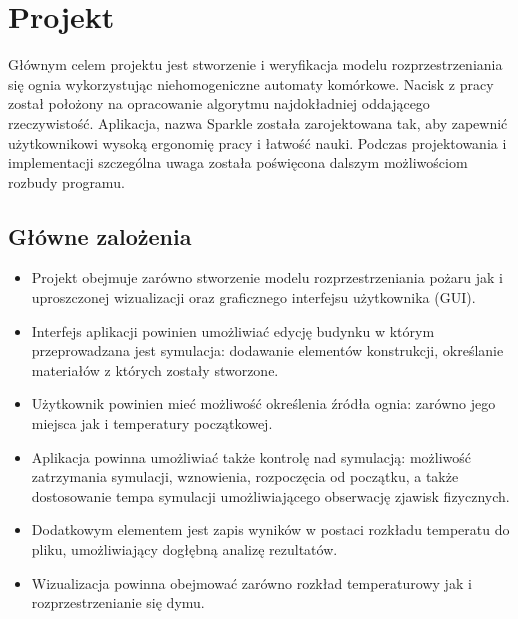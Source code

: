 \chapter {Projekt}
Głównym celem projektu jest stworzenie i weryfikacja modelu rozprzestrzeniania się ognia wykorzystując niehomogeniczne automaty
komórkowe. Nacisk z pracy został położony na opracowanie algorytmu najdokładniej oddającego rzeczywistość.
Aplikacja, nazwa Sparkle została zarojektowana tak, aby zapewnić użytkownikowi wysoką ergonomię pracy i łatwość nauki.
Podczas projektowania i implementacji szczególna uwaga została poświęcona dalszym możliwościom rozbudy programu.
\label{cha:projekt}
\section {Główne zalożenia}
\begin {itemize}
\item Projekt obejmuje zarówno stworzenie modelu rozprzestrzeniania pożaru jak i  uproszczonej wizualizacji oraz graficznego interfejsu użytkownika (GUI).
\item Interfejs aplikacji powinien umożliwiać edycję budynku w którym przeprowadzana jest symulacja: dodawanie elementów konstrukcji, 
określanie materiałów z których zostały stworzone. 
\item Użytkownik powinien mieć możliwość określenia źródła ognia: zarówno jego miejsca jak i temperatury początkowej.
\item Aplikacja powinna umożliwiać także kontrolę nad symulacją: możliwość zatrzymania symulacji, wznowienia, rozpoczęcia od początku,
a także dostosowanie tempa symulacji umożliwiającego obserwację zjawisk fizycznych.
\item Dodatkowym elementem jest zapis wyników w postaci rozkładu temperatu do pliku, umożliwiający dogłębną analizę rezultatów.
\item Wizualizacja powinna obejmować zarówno rozkład temperaturowy jak i rozprzestrzenianie się dymu. 
\end {itemize}
